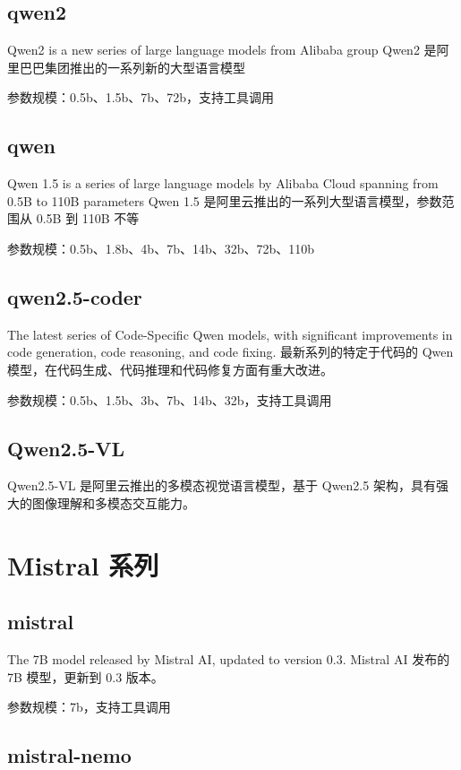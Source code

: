 \documentclass[12pt,UTF8]{ctexbook}
\begin{document}
\subsection{qwen2}

Qwen2 is a new series of large language models from Alibaba group
Qwen2 是阿里巴巴集团推出的一系列新的大型语言模型

参数规模：0.5b、1.5b、7b、72b，支持工具调用

\subsection{qwen}

Qwen 1.5 is a series of large language models by Alibaba Cloud spanning from 0.5B to 110B parameters
Qwen 1.5 是阿里云推出的一系列大型语言模型，参数范围从 0.5B 到 110B 不等

参数规模：0.5b、1.8b、4b、7b、14b、32b、72b、110b

\subsection{qwen2.5-coder}

The latest series of Code-Specific Qwen models, with significant improvements in code generation, code reasoning, and code fixing.
最新系列的特定于代码的 Qwen 模型，在代码生成、代码推理和代码修复方面有重大改进。

参数规模：0.5b、1.5b、3b、7b、14b、32b，支持工具调用

\subsection{Qwen2.5-VL}

Qwen2.5-VL 是阿里云推出的多模态视觉语言模型，基于 Qwen2.5 架构，具有强大的图像理解和多模态交互能力。

\section{Mistral 系列}

\subsection{mistral}

The 7B model released by Mistral AI, updated to version 0.3.
Mistral AI 发布的 7B 模型，更新到 0.3 版本。

参数规模：7b，支持工具调用

\subsection{mistral-nemo}
\end{document}

